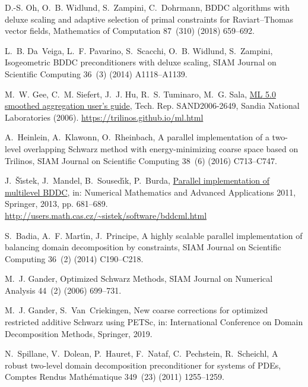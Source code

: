 \documentclass[3p,11pt]{elsarticle}
\begin{document}
\begin{thebibliography}{10}
D.-S. Oh, O.~B. Widlund, S.~Zampini, C.~Dohrmann, {BDDC} algorithms with deluxe
  scaling and adaptive selection of primal constraints for {R}aviart--{T}homas
  vector fields, Mathematics of Computation 87~(310) (2018) 659--692.

L.~B. Da~Veiga, L.~F. Pavarino, S.~Scacchi, O.~B. Widlund, S.~Zampini,
  Isogeometric {BDDC} preconditioners with deluxe scaling, SIAM Journal on
  Scientific Computing 36~(3) (2014) A1118--A1139.

M.~W. Gee, C.~M. Siefert, J.~J. Hu, R.~S. Tuminaro, M.~G. Sala,
  \href{https://trilinos.github.io/ml.html}{{ML} 5.0 smoothed aggregation
  user's guide}, Tech. Rep. SAND2006-2649, Sandia National Laboratories (2006).
\newline\urlprefix\url{https://trilinos.github.io/ml.html}

A.~Heinlein, A.~Klawonn, O.~Rheinbach, A parallel implementation of a two-level
  overlapping {S}chwarz method with energy-minimizing coarse space based on
  {T}rilinos, SIAM Journal on Scientific Computing 38~(6) (2016) C713--C747.

J.~{\v{S}}{\'\i}stek, J.~Mandel, B.~Soused{\'\i}k, P.~Burda,
  \href{http://users.math.cas.cz/~sistek/software/bddcml.html}{Parallel
  implementation of multilevel {BDDC}}, in: Numerical Mathematics and Advanced
  Applications 2011, Springer, 2013, pp. 681--689.
\newline\urlprefix\url{http://users.math.cas.cz/~sistek/software/bddcml.html}

S.~Badia, A.~F. Mart{\'\i}n, J.~Principe, A highly scalable parallel
  implementation of balancing domain decomposition by constraints, SIAM Journal
  on Scientific Computing 36~(2) (2014) C190--C218.

M.~J. Gander, Optimized {S}chwarz {M}ethods, SIAM Journal on Numerical Analysis
  44~(2) (2006) 699--731.

M.~J. Gander, S.~Van~Criekingen, New coarse corrections for optimized
  restricted additive {S}chwarz using {PETS}c, in: International Conference on
  Domain Decomposition Methods, Springer, 2019.

N.~Spillane, V.~Dolean, P.~Hauret, F.~Nataf, C.~Pechstein, R.~Scheichl, A
  robust two-level domain decomposition preconditioner for systems of {PDE}s,
  Comptes Rendus Mathématique 349~(23) (2011) 1255--1259.


\end{thebibliography}
\end{document}
